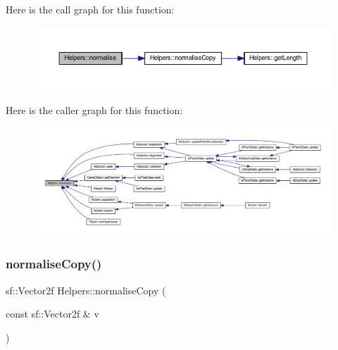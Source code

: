 Here is the call graph for this function\+:
\nopagebreak
\begin{figure}[H]
\begin{center}
\leavevmode
\includegraphics[width=350pt]{namespace_helpers_acf3ecf44a1d56b27ec102715bae903c1_cgraph}
\end{center}
\end{figure}
Here is the caller graph for this function\+:
\nopagebreak
\begin{figure}[H]
\begin{center}
\leavevmode
\includegraphics[width=350pt]{namespace_helpers_acf3ecf44a1d56b27ec102715bae903c1_icgraph}
\end{center}
\end{figure}
\mbox{\label{namespace_helpers_a1c0a40432177c275488a904ea94eda66}} 
\subsubsection{\texorpdfstring{normalise\+Copy()}{normaliseCopy()}}
{\footnotesize\ttfamily sf\+::\+Vector2f Helpers\+::normalise\+Copy (\begin{DoxyParamCaption}\item[{const sf\+::\+Vector2f \&}]{v }\end{DoxyParamCaption})\hspace{0.3cm}{\ttfamily [inline]}}

